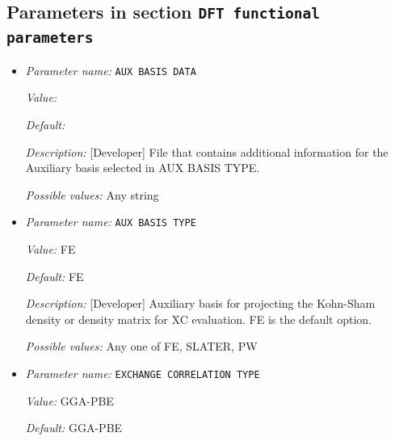 \subsection{Parameters in section \tt DFT functional parameters}
\label{parameters:DFT_20functional_20parameters}

\begin{itemize}
\item {\it Parameter name:} {\tt AUX BASIS DATA}
\label{parameters:DFT functional parameters/AUX BASIS DATA}
\label{parameters:DFT_20functional_20parameters/AUX_20BASIS_20DATA}


{\it Value:} 


{\it Default:} 


{\it Description:} [Developer] File that contains additional information for the Auxiliary basis selected in AUX BASIS TYPE.


{\it Possible values:} Any string
\item {\it Parameter name:} {\tt AUX BASIS TYPE}
\label{parameters:DFT functional parameters/AUX BASIS TYPE}
\label{parameters:DFT_20functional_20parameters/AUX_20BASIS_20TYPE}


{\it Value:} FE


{\it Default:} FE


{\it Description:} [Developer] Auxiliary basis for projecting the Kohn-Sham density or density matrix for XC evaluation. FE is the default option.


{\it Possible values:} Any one of FE, SLATER, PW
\item {\it Parameter name:} {\tt EXCHANGE CORRELATION TYPE}
\label{parameters:DFT functional parameters/EXCHANGE CORRELATION TYPE}
\label{parameters:DFT_20functional_20parameters/EXCHANGE_20CORRELATION_20TYPE}


{\it Value:} GGA-PBE


{\it Default:} GGA-PBE



\end{itemize}
